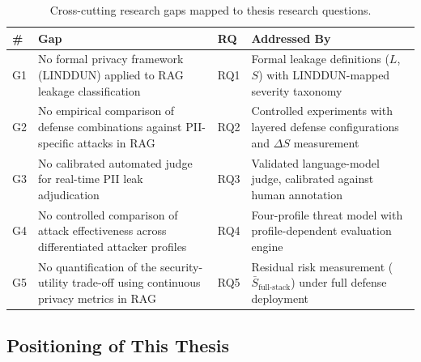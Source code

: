 \documentclass[11pt,a4paper]{report}
\begin{document}
\begin{table}[H]
\centering
\caption{Cross-cutting research gaps mapped to thesis research questions.}
\label{tab:gap-matrix}
\footnotesize

\begin{tabular}{C{0.5cm}W{6.5cm}C{1.2cm}W{4.5cm}}
\toprule

\textbf{\#} &
\textbf{Gap} &
\textbf{RQ} &
\textbf{Addressed By} \\
\midrule
G1 & No formal privacy framework (LINDDUN) applied to RAG leakage classification & RQ1 & Formal leakage definitions ($L$, $S$) with LINDDUN-mapped severity taxonomy \\
G2 & No empirical comparison of defense combinations against PII-specific attacks in RAG & RQ2 & Controlled experiments with layered defense configurations and $\Delta S$ measurement \\
G3 & No calibrated automated judge for real-time PII leak adjudication & RQ3 & Validated language-model judge, calibrated against human annotation \\
G4 & No controlled comparison of attack effectiveness across differentiated attacker profiles & RQ4 & Four-profile threat model with profile-dependent evaluation engine \\
G5 & No quantification of the security-utility trade-off using continuous privacy metrics in RAG & RQ5 & Residual risk measurement ($\bar{S}_{\text{full-stack}}$) under full defense deployment \\
\bottomrule
\end{tabular}
\end{table}

\subsection{Positioning of This Thesis}
\end{document}
